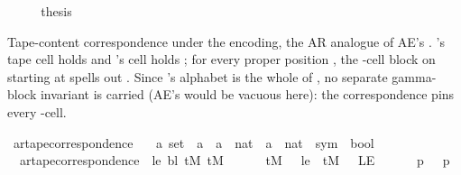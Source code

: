 \begin{isabellebody}
\ \ \isamarkupfalse%
\ \isamarkupfalse%
\ {\isacharquery}{\kern0pt}thesis\ \isakeywordONE{{\isachardot}{\kern0pt}}\isamarkupfalse%
\isanewline
{}\isamarkupfalse%
%
\endisatagproof
{\isafoldproof}%
%
\isadelimproof
%
\endisadelimproof
%
\begin{isamarkuptext}%
Tape-content correspondence under the encoding, the AR
  analogue of AE's .  's
  tape cell  holds  and 's
  cell  holds ; for every proper position
  , the -cell block on
   starting at 
  spells out .  Since
  's alphabet is the whole of , no
  separate gamma-block invariant is carried (AE's
   would be vacuous here): the
  correspondence pins every -cell.%
\end{isamarkuptext}\isamarkuptrue%
\isamarkupfalse%
\ ar{\isacharunderscore}{\kern0pt}tape{\isacharunderscore}{\kern0pt}correspondence\ {\isacharcolon}{\kern0pt}{\isacharcolon}{\kern0pt}\isanewline
\ \ {\isachardoublequoteopen}{\isacharprime}{\kern0pt}a\ set\ {\isasymRightarrow}\ {\isacharprime}{\kern0pt}a\ {\isasymRightarrow}\ {\isacharprime}{\kern0pt}a\ {\isasymRightarrow}\ {\isacharparenleft}{\kern0pt}nat\ {\isasymRightarrow}\ {\isacharprime}{\kern0pt}a{\isacharparenright}{\kern0pt}\ {\isasymRightarrow}\ {\isacharparenleft}{\kern0pt}nat\ {\isasymRightarrow}\ sym{}{\isacharparenright}{\kern0pt}\ {\isasymRightarrow}\ bool{\isachardoublequoteclose}\ \isanewline
\ \ {\isachardoublequoteopen}ar{\isacharunderscore}{\kern0pt}tape{\isacharunderscore}{\kern0pt}correspondence\ {\isasymGamma}\ le\ bl\ tM\ tM{\isacharprime}{\kern0pt}\ {\isasymlongleftrightarrow}\isanewline
\ \ \ \ \ tM\ {}\ {\isacharequal}{\kern0pt}\ le\ {\isasymand}\ tM{\isacharprime}{\kern0pt}\ {}\ {\isacharequal}{\kern0pt}\ LE{}\ {\isasymand}\isanewline
\ \ \ \ \ {\isacharparenleft}{\kern0pt}{\isasymforall}p{\isachardot}{\kern0pt}\ {}\ {\isasymle}\ p\ {\isasymlongrightarrow}\isanewline

\end{isabellebody}

